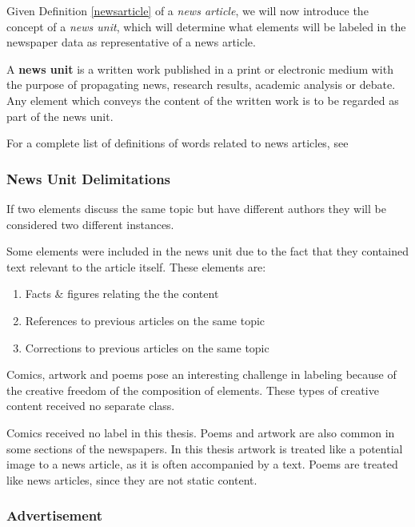\documentclass[oneside, english, bibtex]{kththesis}
\begin{document}
Given Definition \ref{newsarticle} of a \textit{news article}, we will now introduce the concept of a \textit{news unit}, which will determine what elements will be labeled in the newspaper data as representative of a news article.

\begin{definition}
\label{newsunit}
A \textbf{news unit} is a written work published in a print or electronic medium with the purpose of propagating news, research results, academic analysis or debate. Any element which conveys the content of the written work is to be regarded as part of the news unit.
\end{definition}

For a complete list of definitions of words related to news articles, see ~

\subsubsection{News Unit Delimitations}
\label{subsub:labelnewsdelim}

If two elements discuss the same topic but have different authors they will be considered two different instances.

Some elements were included in the news unit due to the fact that they contained text relevant to the article itself. These elements are:

\begin{enumerate}
\item Facts \& figures relating the the content
\item References to previous articles on the same topic
\item Corrections to previous articles on the same topic
\end{enumerate}

Comics, artwork and poems pose an interesting challenge in labeling because of the creative freedom of the composition of elements. These types of creative content received no separate class. 

Comics received no label in this thesis. Poems and artwork are also common in some sections of the newspapers. In this thesis artwork is treated like a potential image to a news article, as it is often accompanied by a text. Poems are treated like news articles, since they are not static content.

\subsubsection{Advertisement}
\label{subsub:labelads}
\end{document}
